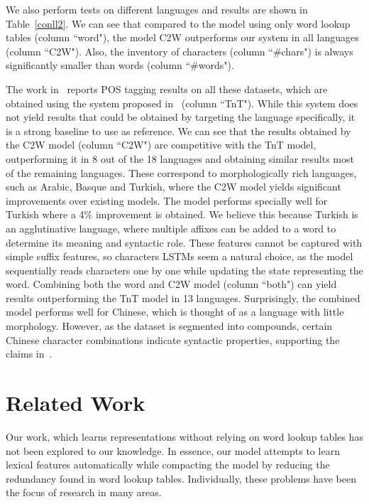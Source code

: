 \documentclass[11pt]{article}
\begin{document}
\begin{CJK*}{UTF8}{gbsn}
{We also perform tests on different languages and results are shown in Table~\ref{conll2}. We can see that compared to the model using only word lookup tables (column ``word"), the model C2W outperforms our system in all languages (column ``C2W"). Also, the inventory of characters (column ``\#chars") is always significantly smaller than words (column ``\#words").

The work in~\cite{Petrov11auniversal} reports POS tagging results on all these datasets, which are obtained using the system proposed in~\cite{Brants:2000:TSP:974147.974178} (column ``TnT"). While this system does not yield results that could be obtained by targeting the language specifically, it is a strong baseline to use as reference. We can see that the results obtained by the C2W model (column ``C2W") are competitive with the TnT model, outperforming it in 8 out of the 18 languages and obtaining similar results most of the remaining languages. These correspond to morphologically rich languages, such as Arabic, Basque and Turkish, where the C2W model yields significant improvements over existing models. The model performs specially well for Turkish where a 4\% improvement is obtained. We believe this because Turkish is an agglutinative language, where multiple affixes can be added to a word to determine its meaning and syntactic role. These features cannot be captured with simple suffix features, so characters LSTMs seem a natural choice, as the model sequentially reads characters one by one while updating the state representing the word. Combining both the word and C2W model (column ``both") can yield results outperforming the TnT model in 13 languages. Surprisingly, the combined model performs well for Chinese, which is thought of as a language with little morphology. However, as the dataset is segmented into compounds, certain Chinese character combinations indicate syntactic properties, supporting the claims in~\cite{HUANG10.397}. 
}

\section{Related Work}
\label{sec:relwork}

Our work, which learns representations without relying on word lookup tables has not been explored to our knowledge. In essence, our model attempts to learn lexical features automatically while compacting the model by reducing the redundancy found in word lookup tables. Individually, these problems have been the focus of research in many areas.


\end{CJK*}
\end{document}
